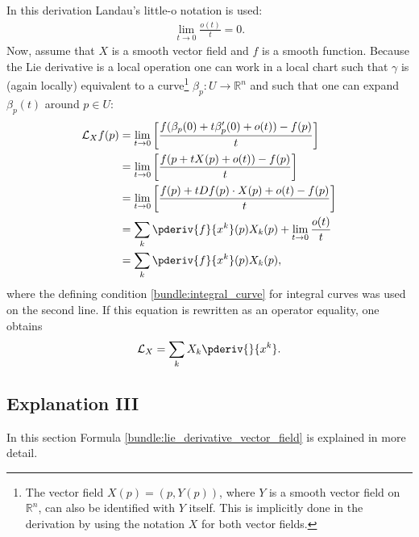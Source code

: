     In this derivation Landau's little-o notation is used:
    \begin{gather}
        \lim_{t\rightarrow0}\frac{o(t)}{t} = 0.
    \end{gather}
    Now, assume that $X$ is a smooth vector field and $f$ is a smooth function. Because the Lie derivative is a local operation one can work in a local chart such that $\gamma$ is (again locally) equivalent to a curve\footnote{The vector field $X(p) = (p,Y(p))$, where $Y$ is a smooth vector field on $\mathbb{R}^n$, can also be identified with $Y$ itself. This is implicitly done in the derivation by using the notation $X$ for both vector fields.} $\beta_p:U\rightarrow\mathbb{R}^n$ and such that one can expand $\beta_p(t)$ around $p\in U$:
    \begin{align}
        \mathcal{L}_Xf(p) &= \lim_{t\rightarrow0}\left[\frac{f(\beta_p(0) + t\beta_p'(0) + o(t)) - f(p)}{t}\right]\nonumber\\
        &= \lim_{t\rightarrow0}\left[\frac{f(p + tX(p) + o(t)) - f(p)}{t}\right]\nonumber\\
        &= \lim_{t\rightarrow0}\left[\frac{f(p) + tDf(p)\cdot X(p) + o(t) - f(p)}{t}\right]\nonumber\\
        &= \sum_k\pderiv{f}{x^k}(p)X_k(p) + \lim_{t\rightarrow0}\frac{o(t)}{t}\nonumber\\
        &= \sum_k\pderiv{f}{x^k}(p)X_k(p),\label{diff:lie_derivative_calc}
    \end{align}
    where the defining condition \ref{bundle:integral_curve} for integral curves was used on the second line. If this equation is rewritten as an operator equality, one obtains
    \begin{gather}
        \mathcal{L}_X = \sum_kX_k\pderiv{}{x^k}.
    \end{gather}

\subsection{Explanation III}

    In this section Formula \ref{bundle:lie_derivative_vector_field} is explained in more detail.

